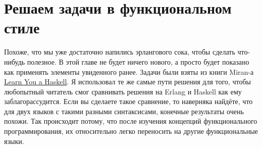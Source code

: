 \chapter{Решаем задачи в функциональном стиле}
\label{functionally-solving-problems}
\colorbox{lgray}
{
\begin{minipage}{1.0\linewidth}
    Похоже, что мы уже достаточно напились эрлангового сока, чтобы сделать что\--нибудь полезное.
    В этой главе не будет ничего нового, а просто будет показано как применять элементы увиденного ранее.
    Задачи были взяты из книги Miran\--а \href{http://learnyouahaskell.com/functionally-solving-problems}{Learn You a Haskell}.
    Я использовал те же самые пути решения для того, чтобы любопытный читатель смог сравнивать решения на Erlang и Haskell как ему заблагорассудится.
    Если вы сделаете такое сравнение, то наверняка найдёте, что для двух языков с такими разными синтаксисами, конечные результаты очень похожи.
    Так происходит потому, что после изучения концепций функционального программирования, их относительно легко переносить на другие функциональные языки.
\end{minipage}
}
